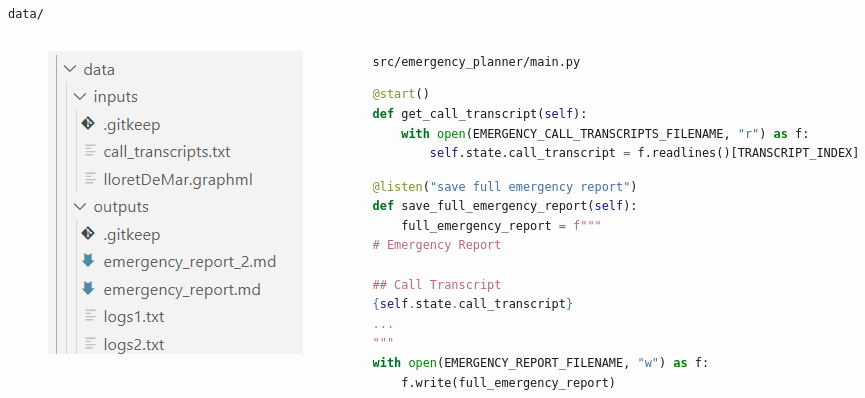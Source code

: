 \begin{frame}[fragile]{\texttt{data/}}
    \begin{columns}
        \begin{column}{0.33\textwidth}
            \begin{figure}
                \includegraphics[width=\textwidth]{figures/data_folder_structure.png}
            \end{figure}
        \end{column}
        \begin{column}{0.67\textwidth}
            \centering
            \texttt{src/emergency\_planner/main.py}
            \begin{lstlisting}[language=Python]
@start()
def get_call_transcript(self):
    with open(EMERGENCY_CALL_TRANSCRIPTS_FILENAME, "r") as f:
        self.state.call_transcript = f.readlines()[TRANSCRIPT_INDEX]
            \end{lstlisting}
            \begin{lstlisting}[language=Python]
@listen("save full emergency report")
def save_full_emergency_report(self):
    full_emergency_report = f"""
# Emergency Report

## Call Transcript
{self.state.call_transcript}
...
"""
with open(EMERGENCY_REPORT_FILENAME, "w") as f:
    f.write(full_emergency_report)
            \end{lstlisting}
        \end{column}
    \end{columns}
\end{frame}